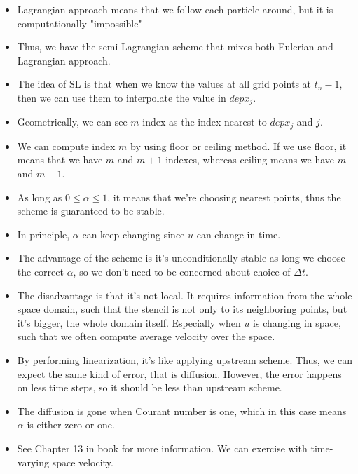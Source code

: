 \documentclass{article}
\begin{document}
\begin{itemize}
    \item Lagrangian approach means that we follow each particle around, but it is computationally "impossible"
    \item Thus, we have the semi-Lagrangian scheme that mixes both Eulerian and Lagrangian approach.
    \item The idea of SL is that when we know the values at all grid points at $t_n-1$, then we can use them to interpolate the value in $depx_j$.
    \item Geometrically, we can see $m$ index as the index nearest to $depx_j$ and $j$.
    \item We can compute index $m$ by using floor or ceiling method. If we use floor, it means that we have $m$ and $m+1$ indexes, whereas ceiling means we have $m$ and $m-1$.
    \item As long as $0 \leq \alpha \leq 1$, it means that we're choosing nearest points, thus the scheme is guaranteed to be stable.
    \item In principle, $\alpha$ can keep changing since $u$ can change in time.
    \item The advantage of the scheme is it's unconditionally stable as long we choose the correct $\alpha$, so we don't need to be concerned about choice of $\Delta t$.
    \item The disadvantage is that it's not local. It requires information from the whole space domain, such that the stencil is not only to its neighboring points, but it's bigger, the whole domain itself. Especially when $u$ is changing in space, such that we often compute average velocity over the space.
    \item By performing linearization, it's like applying upstream scheme. Thus, we can expect the same kind of error, that is diffusion. However, the error happens on less time steps, so it should be less than upstream scheme.
    \item The diffusion is gone when Courant number is one, which in this case means $\alpha$ is either zero or one.
    \item See Chapter 13 in book for more information. We can exercise with time-varying space velocity.
\end{itemize}
\end{document}
